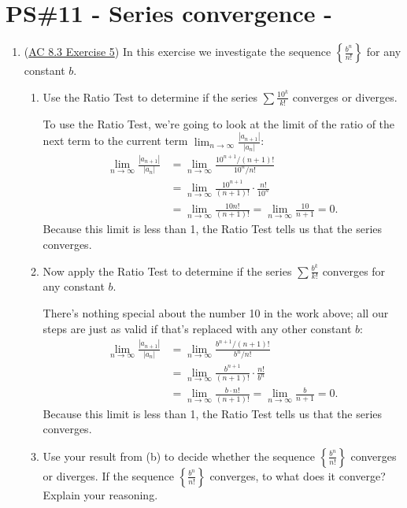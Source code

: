 


%


\allowdisplaybreaks
\section{PS\#11 - Series convergence -  }

\everymath{\displaystyle}
\begin{enumerate}[leftmargin=0pt]

\item (\href{https://activecalculus.org/single/sec-8-3-series.html#CaV}{AC 8.3 Exercise 5}) In this exercise we investigate the sequence $\left\{\frac{b^n}{n!}\right\}$ for any constant $b$.
\begin{enumerate}
    \item Use the Ratio Test to determine if the series $\sum \frac{10^k}{k!}$ converges or diverges.
    
    \begin{red}
    To use the Ratio Test, we're going to look at the limit of the ratio of the next term to the current term $\lim_{n\to\infty} \frac{|a_{n+1}|}{|a_n|}$:
    \begin{align*}
        \lim_{n\to\infty} \frac{|a_{n+1}|}{|a_n|}
        &= \lim_{n\to\infty} \frac{10^{n+1}/(n+1)!}{10^n / n!} \\
        &= \lim_{n\to\infty} \frac{10^{n+1}}{(n+1)!}\cdot \frac{n!}{10^n} \\
        &= \lim_{n\to\infty} \frac{10 n!}{(n+1)!} 
         = \lim_{n\to\infty} \frac{10}{n+1} = 0.
    \end{align*}
    Because this limit is less than 1, the Ratio Test tells us that the series converges.
    \end{red}
    \item Now apply the Ratio Test to determine if the series $\sum \frac{b^k}{k!}$ converges for any constant $b$.
    
    \begin{red}
    There's nothing special about the number 10 in the work above; all our steps are just as valid if that's replaced with any other constant $b$:
    \begin{align*}
        \lim_{n\to\infty} \frac{|a_{n+1}|}{|a_n|}
        &= \lim_{n\to\infty} \frac{b^{n+1}/(n+1)!}{b^n / n!} \\
        &= \lim_{n\to\infty} \frac{b^{n+1}}{(n+1)!}\cdot \frac{n!}{b^n} \\
        &= \lim_{n\to\infty} \frac{b\cdot n!}{(n+1)!} 
         = \lim_{n\to\infty} \frac{b}{n+1} = 0.
    \end{align*}
    Because this limit is less than 1, the Ratio Test tells us that the series converges.
    \end{red}
    \item Use your result from (b) to decide whether the sequence $\left\{\frac{b^n}{n!}\right\}$ converges or diverges. If the sequence $\left\{\frac{b^n}{n!}\right\}$ converges, to what does it converge? Explain your reasoning.
    

\end{enumerate}
\end{enumerate}
